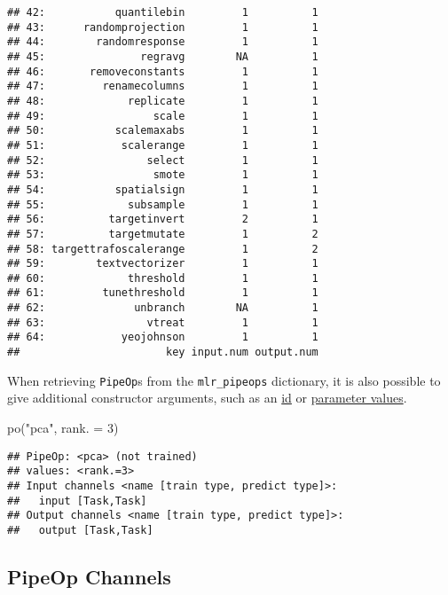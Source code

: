 \documentclass[
]{scrbook}
\newenvironment{Shaded}{\begin{snugshade}}{\end{snugshade}}
\newcommand{\AttributeTok}[1]{\textcolor[rgb]{0.77,0.63,0.00}{#1}}
\newcommand{\DecValTok}[1]{\textcolor[rgb]{0.00,0.00,0.81}{#1}}
\newcommand{\FunctionTok}[1]{\textcolor[rgb]{0.00,0.00,0.00}{#1}}
\newcommand{\NormalTok}[1]{#1}
\newcommand{\StringTok}[1]{\textcolor[rgb]{0.31,0.60,0.02}{#1}}
\renewenvironment{Shaded} {\begin{snugshade}\small} {\end{snugshade}}
\begin{document}
\begin{verbatim}
## 42:           quantilebin         1          1
## 43:      randomprojection         1          1
## 44:        randomresponse         1          1
## 45:               regravg        NA          1
## 46:       removeconstants         1          1
## 47:         renamecolumns         1          1
## 48:             replicate         1          1
## 49:                 scale         1          1
## 50:           scalemaxabs         1          1
## 51:            scalerange         1          1
## 52:                select         1          1
## 53:                 smote         1          1
## 54:           spatialsign         1          1
## 55:             subsample         1          1
## 56:          targetinvert         2          1
## 57:          targetmutate         1          2
## 58: targettrafoscalerange         1          2
## 59:        textvectorizer         1          1
## 60:             threshold         1          1
## 61:         tunethreshold         1          1
## 62:              unbranch        NA          1
## 63:                vtreat         1          1
## 64:            yeojohnson         1          1
##                       key input.num output.num
\end{verbatim}

When retrieving \texttt{PipeOp}s from the \texttt{mlr\_pipeops} dictionary, it is also possible to give additional constructor arguments, such as an \protect\hyperlink{pipeop-ids-and-id-name-clashes}{id} or \protect\hyperlink{hyperparameters}{parameter values}.

\begin{Shaded}
\begin{Highlighting}[]
\FunctionTok{po}\NormalTok{(}\StringTok{"pca"}\NormalTok{, }\AttributeTok{rank. =} \DecValTok{3}\NormalTok{)}
\end{Highlighting}
\end{Shaded}

\begin{verbatim}
## PipeOp: <pca> (not trained)
## values: <rank.=3>
## Input channels <name [train type, predict type]>:
##   input [Task,Task]
## Output channels <name [train type, predict type]>:
##   output [Task,Task]
\end{verbatim}

\hypertarget{pipeop-channels}{%
\subsection{PipeOp Channels}\label{pipeop-channels}}
\end{document}
